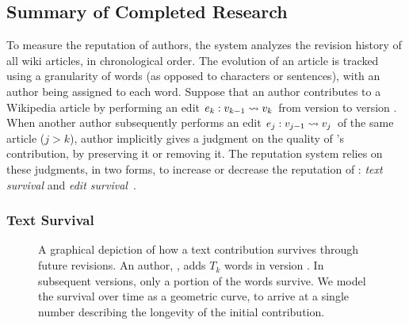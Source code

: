 \subsection{Summary of Completed Research}

To measure the reputation of authors, the system analyzes
the revision history of all wiki articles, in
chronological order.
The evolution of an article is tracked using a granularity
of words (as opposed to characters or sentences),
with an author being assigned to each word.
Suppose that an author  contributes to a Wikipedia article by
performing an edit $e_{k}: v_{k-1} \rightsquigarrow v_{k}$
from version  to
version .
When another author  subsequently performs an edit
$e_{j}: v_{j-1} \rightsquigarrow v_{j}$
of the same article ($j > k$), author 
implicitly gives a judgment on the quality of 's contribution, by
preserving it or removing it.
The reputation system relies on these judgments, in two forms, to increase
or decrease the reputation of : \textit{text survival}
and \textit{edit survival}~\cite{Adler2007}.

\subsubsection*{Text Survival}

\begin{figure}[t]
\centering
{}
\hspace{1ex}
\caption{A graphical depiction of how a text contribution survives
	through future revisions.
	An author, , adds $T_k$ words in version .
	In subsequent versions, only a portion of the words survive.
	We model the survival over time as a geometric curve,
	to arrive at a single number describing the longevity
	of the initial contribution.}
\label{fig-textsurvival}
\end{figure}


